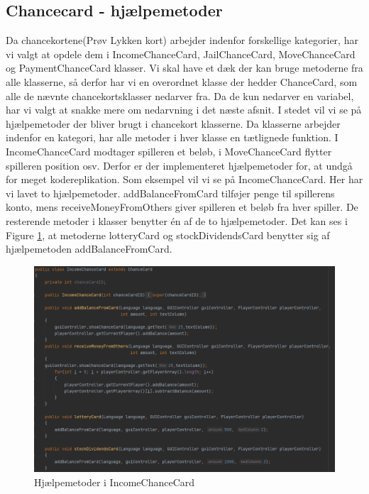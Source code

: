 \begin{flushleft}
\doublespacing

\subsection{Chancecard - hjælpemetoder}
Da chancekortene(Prøv Lykken kort) arbejder indenfor forskellige kategorier, har vi valgt at opdele dem i IncomeChanceCard, JailChanceCard, MoveChanceCard og PaymentChanceCard klasser. Vi skal have et dæk der kan bruge metoderne fra alle klasserne, så derfor har vi en overordnet klasse der hedder ChanceCard, som alle de nævnte chancekortsklasser nedarver fra. Da de kun nedarver en variabel, har vi valgt at snakke mere om nedarvning i det næste afsnit. I stedet vil vi se på hjælpemetoder der bliver brugt i chancekort klasserne. Da klasserne arbejder indenfor en kategori, har alle metoder i hver klasse en tætlignede funktion. I IncomeChanceCard modtager spilleren et beløb, i MoveChanceCard flytter spilleren position osv. Derfor er der implementeret hjælpemetoder for, at undgå for meget kodereplikation.
Som eksempel vil vi se på IncomeChanceCard. Her har vi lavet to hjælpemetoder. addBalanceFromCard tilføjer penge til spillerens konto, mens receiveMoneyFromOthers giver spilleren et beløb fra hver spiller. De resterende metoder i klasser benytter én af de to hjælpemetoder.
Det kan ses i Figure \ref{IncomeChanceCard assist methods}, at metoderne lotteryCard og stockDividendsCard benytter sig af hjælpemetoden addBalanceFromCard.

\begin{figure}[H] %
    \centering
    \includegraphics[width=14cm]{Report/figures/Codesections/IncomeChanceCard_addBalanceFromCard()+receiveMoneyFromOthers().PNG}
    \caption{Hjælpemetoder i IncomeChanceCard}
    \label{IncomeChanceCard assist methods}
\end{figure}



\end{flushleft}
